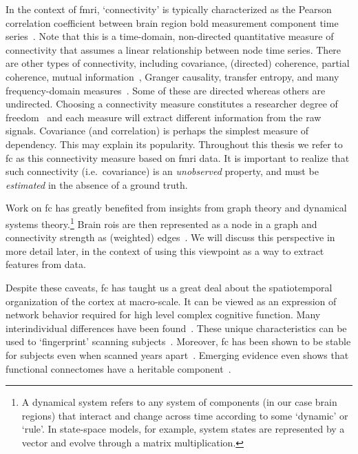 In the context of \gls{fmri}, `connectivity' is typically characterized as the Pearson correlation coefficient between brain region \gls{bold} measurement component time series~\parencite{Zalesky2012}.
Note that this is a time-domain, non-directed quantitative measure of connectivity that assumes a linear relationship between node time series.
There are other types of connectivity, including covariance, (directed) coherence, partial coherence, mutual information~\parencite[see e.g.][chapter 2]{Cover2005}, Granger causality, transfer entropy, and many frequency-domain measures~\parencite[see][for reviews]{Wang2014, VanDiessen2015, Bastos2016, Foti2019}.
Some of these are directed whereas others are undirected.
Choosing a connectivity measure constitutes a researcher degree of freedom~\parencite{Gelman2013} and each measure will extract different information from the raw signals.
%
Covariance (and correlation) is perhaps the simplest measure of dependency.
This may explain its popularity.
Throughout this thesis we refer to \gls{fc} as this connectivity measure based on \gls{fmri} data.
It is important to realize that such connectivity (i.e.~covariance) is an \emph{unobserved} property, and must be \emph{estimated} in the absence of a ground truth.

Work on \gls{fc} has greatly benefited from insights from graph theory and dynamical systems theory.\footnote{A dynamical system refers to any system of components (in our case brain regions) that interact and change across time according to some `dynamic' or `rule'. In state-space models, for example, system states are represented by a vector and evolve through a matrix multiplication.}
Brain \glspl{roi} are then represented as a node in a graph and connectivity strength as (weighted) edges~\parencite{Ryyppo2018}.
We will discuss this perspective in more detail later, in the context of using this viewpoint as a way to extract features from data.

Despite these caveats, \gls{fc} has taught us a great deal about the spatiotemporal organization of the cortex at macro-scale.
It can be viewed as an expression of network behavior required for high level complex cognitive function.
%
Many interindividual differences have been found~\parencite{Liegeois2019}.
These unique characteristics can be used to `fingerprint' scanning subjects~\parencite{Finn2015}.
Moreover, \gls{fc} has been shown to be stable for subjects even when scanned years apart~\parencite{Guo2012}.
Emerging evidence even shows that functional connectomes have a heritable component~\parencite{Jun2022}.
